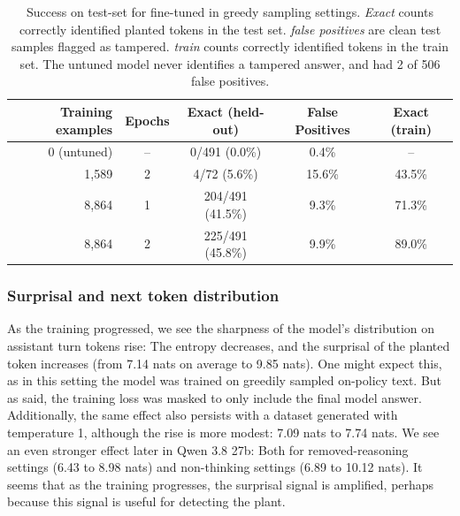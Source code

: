 \begin{table}[t]
\centering
\caption{Success on test-set for \qwenA{} fine-tuned in greedy sampling settings. \emph{Exact} counts correctly identified planted tokens in the test set. \emph{false positives} are clean test samples flagged as tampered. \emph{train} counts correctly identified tokens in the train set. The untuned model never identifies a tampered answer, and had 2 of 506 false positives.}
\label{tab:qwen3-scale}
\begin{tabular}{rcccc}
\toprule
Training examples & Epochs & Exact (held-out) & False Positives & Exact (train) \\
\midrule
0 (untuned) & -- & \phantom{00}0/491 (0.0\%) & \phantom{0}0.4\% & -- \\
1{,}589 & 2 & \phantom{00}4/72\phantom{0} (5.6\%) & 15.6\% & 43.5\% \\
8{,}864 & 1 & 204/491 (41.5\%) & \phantom{0}9.3\% & 71.3\% \\
8{,}864 & 2 & 225/491 (45.8\%) & \phantom{0}9.9\% & 89.0\% \\
\bottomrule
\end{tabular}
\end{table}

\subsubsection{Surprisal and next token distribution}
As the training progressed, we see the sharpness of the model's distribution on assistant turn tokens rise: The entropy decreases, and the surprisal of the planted token increases (from 7.14 nats on average to 9.85 nats). One might expect this, as in this setting the model was trained on greedily sampled on-policy text. But as said, the training loss was masked to only include the final model answer. Additionally, the same effect also persists with a dataset generated with temperature 1, although the rise is more modest: 7.09 nats to 7.74 nats. We see an even stronger effect later in Qwen 3.8 27b: Both for removed-reasoning settings (6.43 to 8.98 nats) and non-thinking settings (6.89 to 10.12 nats). It seems that as the training progresses, the surprisal signal is amplified, perhaps because this signal is useful for detecting the plant.

